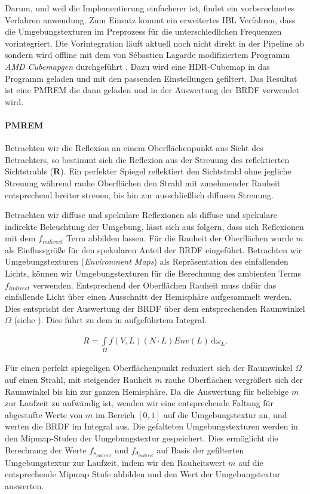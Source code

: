 Darum, und weil die Implementierung einfacherer ist, findet ein vorberechnetes Verfahren anwendung. Zum Einsatz kommt ein erweitertes \acf{IBL} Verfahren, dass die Umgebungstexturen im Preprozess für die unterschiedlichen Frequenzen vorintegriert. Die Vorintegration läuft aktuell noch nicht direkt in der Pipeline ab sondern wird offline mit dem von Sébastien Lagarde modifiziertem Programm \textit{AMD Cubemapgen} durchgeführt \parencite{Lagarde2012a}. Dazu wird eine HDR-Cubemap in das Programm geladen und mit den passenden Einstellungen gefiltert. Das Resultat ist eine \ac{PMREM} die dann geladen und in der Auswertung der \ac{BRDF} verwendet wird.

\paragraph{\acl{PMREM}} Betrachten wir die Reflexion an einem Oberflächenpunkt aus Sicht des Betrachters, so bestimmt sich die Reflexion aus der Streuung des reflektierten Sichtstrahls ($\mathbf R$). Ein perfekter Spiegel reflektiert den Sichtstrahl ohne jegliche Streuung während rauhe Oberflächen den Strahl mit zunehmender Rauheit entsprechend breiter streuen, bis hin zur ausschließlich diffusen Streuung.

Betrachten wir diffuse und spekulare Reflexionen als diffuse und spekulare indirekte Beleuchtung der Umgebung, lässt sich aus  folgern, dass sich Reflexionen mit dem $f_{indirect}$ Term abbilden lassen. Für die Rauheit der Oberflächen wurde $m$ als Einflussgröße für den spekularen Anteil der \ac{BRDF} eingeführt. Betrachten wir Umgebungstexturen (\textit{Environment Maps}) als Repräsentation des einfallenden Lichts, können wir Umgebungstexturen für die Berechnung des ambienten Terms $f_{indirect}$ verwenden. Entsprechend der Oberflächen Rauheit muss dafür das einfallende Licht über einen Ausschnitt der Hemisphäre aufgesammelt werden. Dies entspricht der Auswertung der \ac{BRDF} über dem entsprechenden Raumwinkel $\Omega$ (siehe ). Dies führt zu dem in  aufgeführtem Integral.

\begin{align}
	\label{eq:ambient-integral}
	R = \int\limits_{\Omega} f(V,L)(N \cdot L)Env(L)\, \mathrm{d}\omega_L.
\end{align}

Für einen perfekt spiegeligen Oberflächenpunkt reduziert sich der Raumwinkel $\Omega$ auf einen Strahl, mit steigender Rauheit $m$ rauhe Oberflächen vergrößert sich der Raumwinkel bis hin zur ganzen Hemisphäre. Da die Auswertung für beliebige $m$ zur Laufzeit zu aufwändig ist, wenden wir eine entsprechende Faltung für abgestufte Werte von $m$ im Bereich $[0,1]$ auf die Umgebungstextur an, und werten die \ac{BRDF} im Integral aus. Die gefalteten Umgebungstexturen werden in den Mipmap-Stufen der Umgebungstextur gespeichert. Dies ermöglicht die Berechnung der Werte $f_{s_{indirect}}$ und $f_{d_{indirect}}$ auf Basis der gefilterten Umgebungstextur zur Laufzeit, indem wir den Rauheitswert $m$ auf die entsprechende Mipmap Stufe abbilden und den  Wert der Umgebungstextur auswerten.


